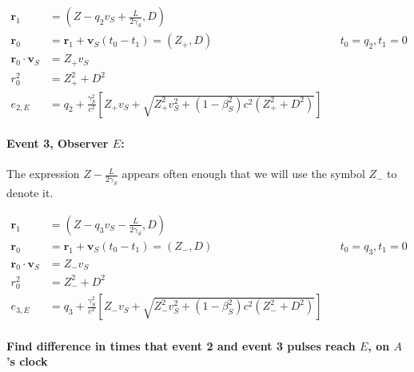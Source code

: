 \documentclass[a4paper]{article}
\theoremstyle{plain}
\theoremstyle{definition}
\newcommand{\vect}[1]{\mathbf{#1}}
\begin{document}
\begin{align}
\vect{r}_1 & = (Z - q_2v_S + \frac{L}{2\gamma_S}, D) \nonumber \\
\vect{r}_0 & = \vect{r}_1 + \vect{v}_S (t_0 - t_1) = (Z_{+}, D) & & \text{$t_0=q_2, t_1=0$} \nonumber \\
\vect{r}_0 \cdot \vect{v}_S & = Z_{+}v_S \\
r_0^2 & = Z_{+}^2 + D^2 \nonumber \\
e_{2,E} & = q_2 + \frac{\gamma_S^2}{c^2} \left[ Z_{+}v_S + \sqrt{ Z_{+}^2v_S^2 + (1-\beta_S^2)c^2(Z_{+}^2 + D^2) } \right] \nonumber
\end{align}


\paragraph{Event 3, Observer $E$:}

The expression $Z - \frac{L}{2\gamma_S}$ appears often enough that we
will use the symbol $Z_{-}$ to denote it.

\begin{align}
\vect{r}_1 & = (Z - q_3v_S - \frac{L}{2\gamma_S}, D) \nonumber \\
\vect{r}_0 & = \vect{r}_1 + \vect{v}_S (t_0 - t_1) = (Z_{-}, D) & & \text{$t_0=q_3, t_1=0$} \nonumber \\
\vect{r}_0 \cdot \vect{v}_S & = Z_{-}v_S \\
r_0^2 & = Z_{-}^2 + D^2 \nonumber \\
e_{3,E} & = q_3 + \frac{\gamma_S^2}{c^2} \left[ Z_{-}v_S + \sqrt{ Z_{-}^2v_S^2 + (1-\beta_S^2)c^2(Z_{-}^2 + D^2) } \right] \nonumber
\end{align}


\paragraph{Find difference in times that event 2 and event 3 pulses reach $E$, on $A$'s clock}
\end{document}
